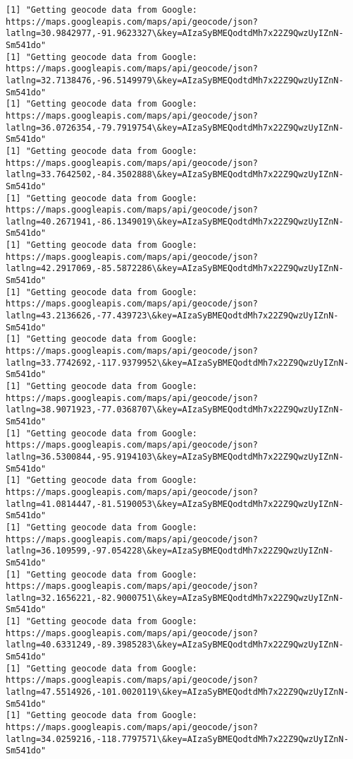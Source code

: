 \documentclass[11pt]{article}
\begin{document}
\begin{Verbatim}[commandchars=\\\{\}]
[1] "Getting geocode data from Google: https://maps.googleapis.com/maps/api/geocode/json?latlng=30.9842977,-91.9623327\&key=AIzaSyBMEQodtdMh7x22Z9QwzUyIZnN-Sm541do"
[1] "Getting geocode data from Google: https://maps.googleapis.com/maps/api/geocode/json?latlng=32.7138476,-96.5149979\&key=AIzaSyBMEQodtdMh7x22Z9QwzUyIZnN-Sm541do"
[1] "Getting geocode data from Google: https://maps.googleapis.com/maps/api/geocode/json?latlng=36.0726354,-79.7919754\&key=AIzaSyBMEQodtdMh7x22Z9QwzUyIZnN-Sm541do"
[1] "Getting geocode data from Google: https://maps.googleapis.com/maps/api/geocode/json?latlng=33.7642502,-84.3502888\&key=AIzaSyBMEQodtdMh7x22Z9QwzUyIZnN-Sm541do"
[1] "Getting geocode data from Google: https://maps.googleapis.com/maps/api/geocode/json?latlng=40.2671941,-86.1349019\&key=AIzaSyBMEQodtdMh7x22Z9QwzUyIZnN-Sm541do"
[1] "Getting geocode data from Google: https://maps.googleapis.com/maps/api/geocode/json?latlng=42.2917069,-85.5872286\&key=AIzaSyBMEQodtdMh7x22Z9QwzUyIZnN-Sm541do"
[1] "Getting geocode data from Google: https://maps.googleapis.com/maps/api/geocode/json?latlng=43.2136626,-77.439723\&key=AIzaSyBMEQodtdMh7x22Z9QwzUyIZnN-Sm541do"
[1] "Getting geocode data from Google: https://maps.googleapis.com/maps/api/geocode/json?latlng=33.7742692,-117.9379952\&key=AIzaSyBMEQodtdMh7x22Z9QwzUyIZnN-Sm541do"
[1] "Getting geocode data from Google: https://maps.googleapis.com/maps/api/geocode/json?latlng=38.9071923,-77.0368707\&key=AIzaSyBMEQodtdMh7x22Z9QwzUyIZnN-Sm541do"
[1] "Getting geocode data from Google: https://maps.googleapis.com/maps/api/geocode/json?latlng=36.5300844,-95.9194103\&key=AIzaSyBMEQodtdMh7x22Z9QwzUyIZnN-Sm541do"
[1] "Getting geocode data from Google: https://maps.googleapis.com/maps/api/geocode/json?latlng=41.0814447,-81.5190053\&key=AIzaSyBMEQodtdMh7x22Z9QwzUyIZnN-Sm541do"
[1] "Getting geocode data from Google: https://maps.googleapis.com/maps/api/geocode/json?latlng=36.109599,-97.054228\&key=AIzaSyBMEQodtdMh7x22Z9QwzUyIZnN-Sm541do"
[1] "Getting geocode data from Google: https://maps.googleapis.com/maps/api/geocode/json?latlng=32.1656221,-82.9000751\&key=AIzaSyBMEQodtdMh7x22Z9QwzUyIZnN-Sm541do"
[1] "Getting geocode data from Google: https://maps.googleapis.com/maps/api/geocode/json?latlng=40.6331249,-89.3985283\&key=AIzaSyBMEQodtdMh7x22Z9QwzUyIZnN-Sm541do"
[1] "Getting geocode data from Google: https://maps.googleapis.com/maps/api/geocode/json?latlng=47.5514926,-101.0020119\&key=AIzaSyBMEQodtdMh7x22Z9QwzUyIZnN-Sm541do"
[1] "Getting geocode data from Google: https://maps.googleapis.com/maps/api/geocode/json?latlng=34.0259216,-118.7797571\&key=AIzaSyBMEQodtdMh7x22Z9QwzUyIZnN-Sm541do"

\end{Verbatim}
\end{document}
